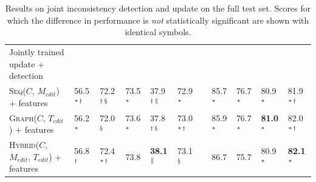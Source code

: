 \documentclass[letterpaper]{article} %
\makeatletter
\newcommand{\Comment}{$C$}
\newcommand{\EditCode}{$M_{edit}$}
\newcommand{\EditTree}{$T_{edit}$}
\newcommand{\SeqModel}{\textsc{Seq}}
\newcommand{\GraphModel}{\textsc{Graph}}
\newcommand{\HybridModel}{\textsc{Hybrid}}
\newcommand{\JustInTimeSeq}{\SeqModel{}(\Comment{}, \EditCode{})}
\newcommand{\JustInTimeGraph}{\GraphModel{}(\Comment{}, \EditTree{})}
\newcommand{\JustInTimeHybrid}{\HybridModel{}(\Comment{}, \EditCode{}, \EditTree{})}
\newcommand{\JointlyTrained}{Jointly trained update + detection}
\def\@fnsymbol#1{\ensuremath{\ifcase#1\or *\or \dagger\or \ddagger\or
   \mathsection\or \mathparagraph\or \|\or **\or \dagger\dagger
   \or \ddagger\ddagger \else\@ctrerr\fi}}
\newcommand{\ssymbol}[1]{^{\@fnsymbol{#1}}}
\makeatother
\begin{document}
\begin{table}
\begin{tabular}{l@{\hskip 3mm}llllll@{\hskip 1mm}llll}
\JointlyTrained{} &  &  &  &  &  & &  &  &   &  \\
\hspace{0.2cm}\JustInTimeSeq{} + features & 56.5$\ssymbol{1}$$\ssymbol{2}$ & 72.2$\ssymbol{2}$$\ssymbol{4}$ & 73.5$\ssymbol{1}$ & 37.9$\ssymbol{2}$$\ssymbol{6}$ & 72.9$\ssymbol{1}$ && 85.7$\ssymbol{1}$ & 76.7$\ssymbol{1}$ & 80.9$\ssymbol{1}$ & 81.9$\ssymbol{1}$$\ssymbol{2}$ \\
\hspace{0.2cm}\JustInTimeGraph{} + features &  56.2$\ssymbol{1}$ & 72.0$\ssymbol{4}$ & 73.6$\ssymbol{1}$ & 37.8$\ssymbol{2}$$\ssymbol{4}$ & 73.0$\ssymbol{1}$$\ssymbol{2}$ && 85.9$\ssymbol{1}$ & 76.7$\ssymbol{1}$ & \bf 81.0$\ssymbol{1}$ & 82.0$\ssymbol{1}$$\ssymbol{2}$ \\
\hspace{0.2cm}\JustInTimeHybrid{} + features &  56.8$\ssymbol{2}$ & 72.4$\ssymbol{1}$$\ssymbol{2}$ & 73.8 & \bf 38.1$\ssymbol{6}$ & 73.1$\ssymbol{4}$ && 86.7 & 75.7 & 80.9$\ssymbol{1}$ & \bf 82.1$\ssymbol{1}$ \\
\hline
\end{tabular}
\vspace{-5pt}
\caption{\label{table:full-comment-update-table} Results on joint inconsistency detection and update on the full test set. Scores for which the difference in performance is \textit{not} statistically significant are shown with identical symbols.}
\end{table}
																																
\end{document}
